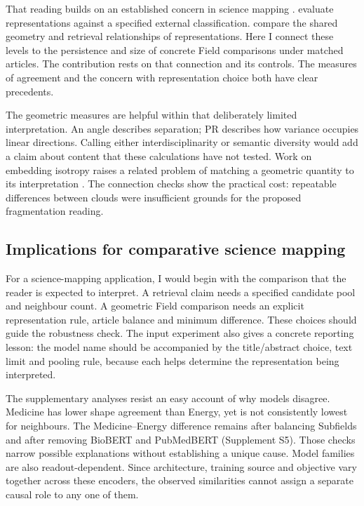 \documentclass[12pt]{article}
\begin{document}
That reading builds on an established concern in science mapping \citep{refa0d2d707e6,ref6a2f5912bc}. \citet{refc0e2cc29e0} evaluate representations against a specified external classification. \citet{ref4e1e0d5582} compare the shared geometry and retrieval relationships of representations. Here I connect these levels to the persistence and size of concrete Field comparisons under matched articles. The contribution rests on that connection and its controls. The measures of agreement and the concern with representation choice both have clear precedents.

The geometric measures are helpful within that deliberately limited interpretation. An angle describes separation; PR describes how variance occupies linear directions. Calling either interdisciplinarity or semantic diversity would add a claim about content that these calculations have not tested. Work on embedding isotropy raises a related problem of matching a geometric quantity to its interpretation \citep{rudman-etal-2022-isoscore}. The connection checks show the practical cost: repeatable differences between clouds were insufficient grounds for the proposed fragmentation reading.

\subsection{Implications for comparative science mapping}
For a science-mapping application, I would begin with the comparison that the reader is expected to interpret. A retrieval claim needs a specified candidate pool and neighbour count. A geometric Field comparison needs an explicit representation rule, article balance and minimum difference. These choices should guide the robustness check. The input experiment also gives a concrete reporting lesson: the model name should be accompanied by the title/abstract choice, text limit and pooling rule, because each helps determine the representation being interpreted.

The supplementary analyses resist an easy account of why models disagree. Medicine has lower shape agreement than Energy, yet is not consistently lowest for neighbours. The Medicine--Energy difference remains after balancing Subfields and after removing BioBERT and PubMedBERT (Supplement S5). Those checks narrow possible explanations without establishing a unique cause. Model families are also readout-dependent. Since architecture, training source and objective vary together across these encoders, the observed similarities cannot assign a separate causal role to any one of them.
\end{document}

